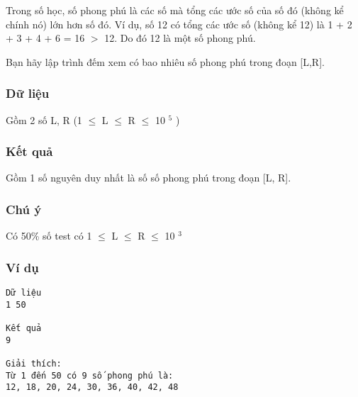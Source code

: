 



   Trong số học, số phong phú là các số mà tổng các ước số của số đó (không kể chính nó) lớn hơn số đó. Ví dụ, số 12 có tổng các ước số (không kể 12) là 1 + 2 + 3 + 4 + 6 = 16 $>$ 12. Do đó 12 là một số phong phú.  

   Bạn hãy lập trình đếm xem có bao nhiêu số phong phú trong đoạn [L,R].  

\subsubsection{   Dữ liệu  }

   Gồm 2 số L, R (1  $\le$  L  $\le$  R  $\le$  10   $^    5   $   )  

\subsubsection{   Kết quả  }

   Gồm 1 số nguyên duy nhất là số số phong phú trong đoạn [L, R].  

\subsubsection{   Chú ý  }

   Có 50\% số test có 1  $\le$  L  $\le$  R  $\le$  10   $^    3   $

\subsubsection{   Ví dụ  }
\begin{verbatim}
Dữ liệu
1 50

Kết quả
9

Giải thích:
Từ 1 đến 50 có 9 số phong phú là: 
12, 18, 20, 24, 30, 36, 40, 42, 48
\end{verbatim}
